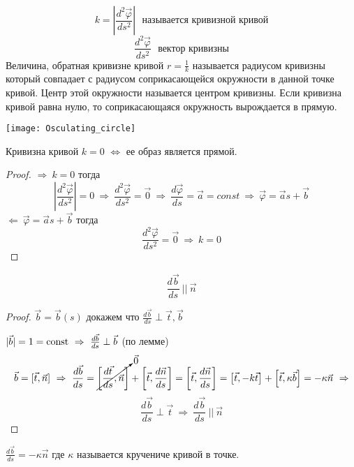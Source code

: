 \begin{define}
  $$
  k =
  \left|
    \frac{d^2 \vec \varphi}{d s^2}
  \right| ~~~
  \text{называется кривизной кривой}
  $$
  $$
    \frac{d^2 \vec \varphi}{d s^2} ~~~ \text{вектор кривизны}
  $$
  Величина, обратная кривизне кривой $r = \frac{1}{k}$ называется радиусом
  кривизны который совпадает с радиусом соприкасающейся окружности в данной
  точке кривой. Центр этой окружности называется центром кривизны. Если кривизна
  кривой равна нулю, то соприкасающаяся окружность вырождается в прямую.

  \texttt{[image: Osculating\_circle]}
\end{define}

\begin{theorem}
  Кривизна кривой $k = 0$ $\Leftrightarrow$ ее образ является прямой.
\end{theorem}

\begin{proof}
  $\Rightarrow ~ k = 0$ тогда
  $$
  \left| \frac{d^2 \vec \varphi}{ds^2} \right| = 0 ~ \Rightarrow ~
  \frac{d^2 \vec \varphi}{ds^2} = \vec 0 ~ \Rightarrow ~
  \frac{d\vec \varphi}{d s} = \vec a = const ~ \Rightarrow ~
  \vec \varphi = \vec a s + \vec b
  $$
  $\Leftarrow ~ \vec \varphi = \vec a s + \vec b$ тогда
  $$
  \frac{d^2 \vec \varphi}{ds^2} = \vec 0 ~ \Rightarrow ~ k = 0
  $$
\end{proof}

\begin{block}[Лемма]
  $$
  \frac{d\vec b}{ds} ~ || ~ \vec n
  $$
\end{block}

\begin{proof}
  $\vec b = \vec b(s)$ докажем что $\frac{d \vec b}{ds} \perp \vec t, \vec b$

  $|\vec b| = 1 = \mathrm{const} ~ \Rightarrow ~ \frac{d\vec b}{ds} \perp \vec b$
  (по лемме)
  $$
  \vec b = [\vec t, \vec n] ~ \Rightarrow ~ \frac{d\vec b}{ds} =
  \cancelto{\vec 0}{\left[\frac{d \vec t}{ds}, \vec n\right]} +
  \left[\vec t, \frac{d\vec n}{ds}\right] =
  \left[\vec t, \frac{d\vec n}{ds}\right] =
  \left[\vec t, -k \vec t \right] + \left[\vec t, \kappa \vec b \right] =
  -\kappa \vec n ~ \Rightarrow
  $$
  $$
  \frac{d\vec b}{ds}
  \perp \vec t ~ \Rightarrow ~  \frac{d\vec b}{ds} ~ || ~ \vec n
  $$
\end{proof}

\begin{define}
  $\frac{d\vec b}{ds} = -\kappa \vec n$ где $\kappa$ называется кручениче кривой
  в точке.
\end{define}

